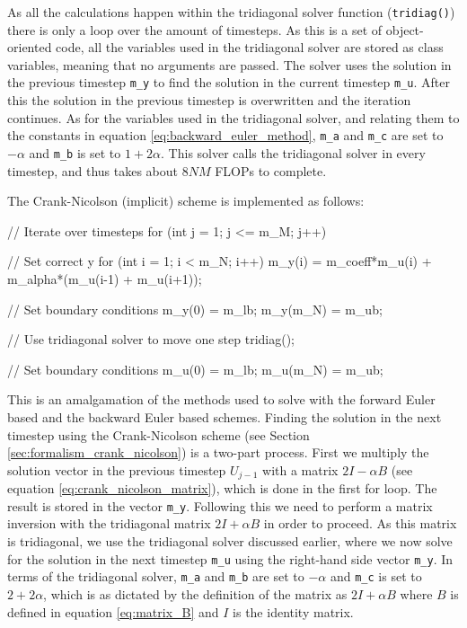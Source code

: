 \documentclass[reprint,english,notitlepage]{revtex4-1}  %
\begin{document}
As all the calculations happen within the tridiagonal solver function (\verb+tridiag()+) there is only a loop over the amount of timesteps. As this is a set of object-oriented code, all the variables used in the tridiagonal solver are stored as class variables, meaning that no arguments are passed. The solver uses the solution in the previous timestep \verb+m_y+ to find the solution in the current timestep \verb+m_u+. After this the solution in the previous timestep is overwritten and the iteration continues. As for the variables used in the tridiagonal solver, and relating them to the constants in equation \eqref{eq:backward_euler_method}, \verb+m_a+ and \verb+m_c+ are set to $-\alpha$ and \verb+m_b+ is set to $1 + 2\alpha$. This solver calls the tridiagonal solver in every timestep, and thus takes about $8NM$ FLOPs to complete.

The Crank-Nicolson (implicit) scheme is implemented as follows:

\begin{cpp}
// Iterate over timesteps
for (int j = 1; j <= m_M; j++){
  // Set correct y
  for (int i = 1; i < m_N; i++){
    m_y(i) = m_coeff*m_u(i) + m_alpha*(m_u(i-1) + m_u(i+1));
  }

  // Set boundary conditions
  m_y(0) = m_lb;
  m_y(m_N) = m_ub;

  // Use tridiagonal solver to move one step
  tridiag();

  // Set boundary conditions
  m_u(0) = m_lb;
  m_u(m_N) = m_ub;
}
\end{cpp}

This is an amalgamation of the methods used to solve with the forward Euler based and the backward Euler based schemes. Finding the solution in the next timestep using the Crank-Nicolson scheme (see Section \ref{sec:formalism_crank_nicolson}) is a two-part process. First we multiply the solution vector in the previous timestep $U_{j-1}$ with a matrix $2I - \alpha B$ (see equation \eqref{eq:crank_nicolson_matrix}), which is done in the first for loop. The result is stored in the vector \verb+m_y+. Following this we need to perform a matrix inversion with the tridiagonal matrix $2I + \alpha B$ in order to proceed. As this matrix is tridiagonal, we use the tridiagonal solver discussed earlier, where we now solve for the solution in the next timestep \verb+m_u+ using the right-hand side vector \verb+m_y+. In terms of the tridiagonal solver, \verb+m_a+ and \verb+m_b+ are set to $-\alpha$ and \verb+m_c+ is set to $2 + 2\alpha$, which is as dictated by the definition of the matrix as $2I + \alpha B$ where $B$ is defined in equation \eqref{eq:matrix_B} and $I$ is the identity matrix. 
\end{document}
